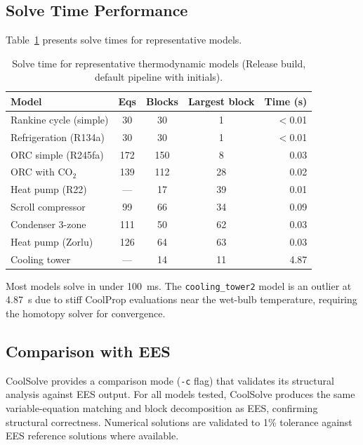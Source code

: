 \documentclass[review,3p]{elsarticle}
\begin{document}
\subsection{Solve Time Performance}

Table~\ref{tab:timing} presents solve times for representative models.

\begin{table}[htbp]
\centering
\caption{Solve time for representative thermodynamic models (Release build, default pipeline with initials).}
\label{tab:timing}
\begin{tabular}{@{}lcccr@{}}
\toprule
\textbf{Model} & \textbf{Eqs} & \textbf{Blocks} & \textbf{Largest block} & \textbf{Time (s)} \\
\midrule
Rankine cycle (simple)       & 30  & 30  & 1   & $<$0.01 \\
Refrigeration (R134a)        & 30  & 30  & 1   & $<$0.01 \\
ORC simple (R245fa)          & 172 & 150 & 8   & 0.03 \\
ORC with CO$_2$              & 139 & 112 & 28  & 0.02 \\
Heat pump (R22)              & ---  & 17  & 39  & 0.01 \\
Scroll compressor            & 99  & 66  & 34  & 0.09 \\
Condenser 3-zone             & 111 & 50  & 62  & 0.03 \\
Heat pump (Zorlu)            & 126 & 64  & 63  & 0.03 \\
Cooling tower                & --- & 14  & 11  & 4.87 \\
\bottomrule
\end{tabular}
\end{table}

Most models solve in under 100~ms. The \texttt{cooling\_tower2} model is an outlier at 4.87~s due to stiff CoolProp evaluations near the wet-bulb temperature, requiring the homotopy solver for convergence.

\subsection{Comparison with EES}

CoolSolve provides a comparison mode (\texttt{-c} flag) that validates its structural analysis against EES output. For all models tested, CoolSolve produces the same variable-equation matching and block decomposition as EES, confirming structural correctness. Numerical solutions are validated to 1\% tolerance against EES reference solutions where available.
\end{document}

